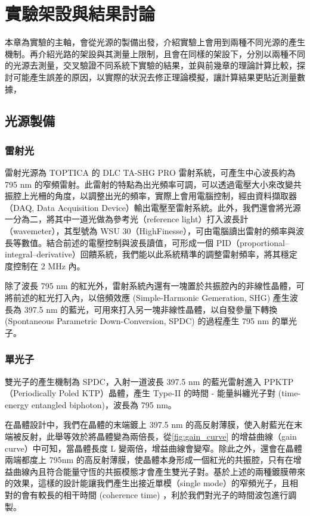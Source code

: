 \documentclass[class=NCU_thesis, crop=false]{standalone}
\begin{document}
\chapter{實驗架設與結果討論}
本章為實驗的主軸，會從光源的製備出發，介紹實驗上會用到兩種不同光源的產生機制。再介紹光路的架設與其測量上限制，且會在同樣的架設下，分別以兩種不同的光源去測量，交叉驗證不同系統下實驗的結果，並與前幾章的理論計算比較，探討可能產生誤差的原因，以實際的狀況去修正理論模擬，讓計算結果更貼近測量數據，

\section{光源製備}

\subsection{雷射光}
雷射光源為 TOPTICA 的 DLC TA-SHG PRO 雷射系統，可產生中心波長約為 795 nm 的窄頻雷射。此雷射的特點為出光頻率可調，可以透過電壓大小來改變共振腔上光柵的角度，以調整出光的頻率，實際上會用電腦控制，經由資料擷取器（DAQ, Data Acquisition Device）輸出電壓至雷射系統。此外，我們還會將光源一分為二，將其中一道光做為參考光（reference light）打入波長計（wavemeter），其型號為 WSU 30（HighFinesse），可由電腦讀出雷射的頻率與波長等數值。結合前述的電壓控制與波長讀值，可形成一個 PID（proportional–integral–derivative）回饋系統，我們能以此系統精準的調整雷射頻率，將其穩定度控制在 2 MHz 內。

除了波長 795 nm 的紅光外，雷射系統內還有一塊置於共振腔內的非線性晶體，可將前述的紅光打入內，以倍頻效應 (Simple-Harmonic Gemeration, SHG) 產生波長為 397.5 nm 的藍光，可用來打入另一塊非線性晶體，以自發參量下轉換 (Spontaneous Parametric Down-Conversion, SPDC) 的過程產生 795 nm 的單光子。


\subsection{單光子}
\label{subsection:single_photon}
雙光子的產生機制為 SPDC，入射一道波長 397.5 nm 的藍光雷射進入 PPKTP （Periodically Poled KTP）晶體，產生 Type-II 的時間 - 能量糾纏光子對 (time-energy entangled biphoton)，波長為 795 nm。

在晶體設計中，我們在晶體的末端鍍上 397.5 nm 的高反射薄膜，使入射藍光在末端被反射，此舉等效於將晶體變為兩倍長，從\cref{fig:gain_curve} 的增益曲線（gain curve）中可知，當晶體長度 L 變兩倍，增益曲線會變窄。除此之外，還會在晶體兩端都度上 795nm 的高反射薄膜，使晶體本身形成一個紅光的共振腔，只有在增益曲線內且符合能量守恆的共振模態才會產生雙光子對。基於上述的兩種鍍膜帶來的效果，這樣的設計能讓我們產生出接近單模（single mode）的窄頻光子，且相對的會有較長的相干時間 (coherence time) ，利於我們對光子的時間波包進行調製。
\end{document}
